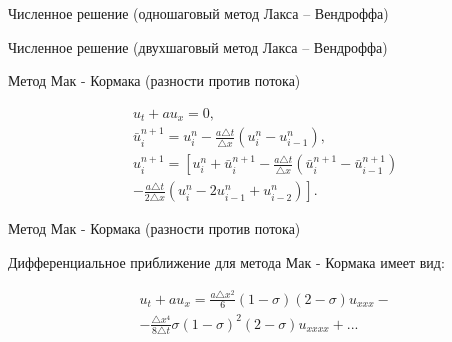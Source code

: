 \documentclass[10pt,xcolor=pst,aspectratio=169]{beamer}
\begin{document}
\begin{frame}{Численное решение (одношаговый метод Лакса -- Вендроффа)}

	\transdissolve[duration=0.1]
	\justifying
	\large

    \begin{figure}[h]
    \end{figure}

\end{frame}

\begin{frame}{Численное решение (двухшаговый метод Лакса -- Вендроффа)}

	\transdissolve[duration=0.1]
	\justifying
	\large

    \begin{figure}[h]
    \end{figure}

\end{frame}

\begin{frame}{Метод Мак - Кормака (разности против потока)}

	\transdissolve[duration=0.1]
	\justifying
	\large

	\[
		\begin{split}
			&u_{t} + a u_{x} = 0 , \\
			&\bar{u}^{n + 1}_{i} = u^{n}_{i} - \frac{a \triangle t}{\triangle x} (u^{n}_{i} - u^{n}_{i - 1}) , \\
			&u^{n + 1}_{i} = \left[ u^{n}_{i} + \bar{u}^{n + 1}_{i} - \frac{a \triangle t}{\triangle x} (\bar{u}^{n + 1}_{i} - \bar{u}^{n + 1}_{i - 1}) \right. \\
			& \left. - \frac{a \triangle t}{2 \triangle x} (u^{n}_{i} - 2 u^{n}_{i - 1} + u^{n}_{i - 2}) \right] .
		\end{split}
	\]

\end{frame}

\begin{frame}{Метод Мак - Кормака (разности против потока)}

	\transdissolve[duration=0.1]
	\justifying
	\large

	Дифференциальное приближение для метода Мак - Кормака имеет вид:

	\[
		\begin{split}
			&u_{t} + a u_{x} = \frac{a \triangle x^{2}}{6} (1 - \sigma) (2 - \sigma) u_{xxx} - \\
			& - \frac{\triangle x^{4}}{8 \triangle t} \sigma (1 - \sigma)^{2} (2 - \sigma) u_{xxxx} + ...
		\end{split}
	\]

\end{frame}
\end{document}
